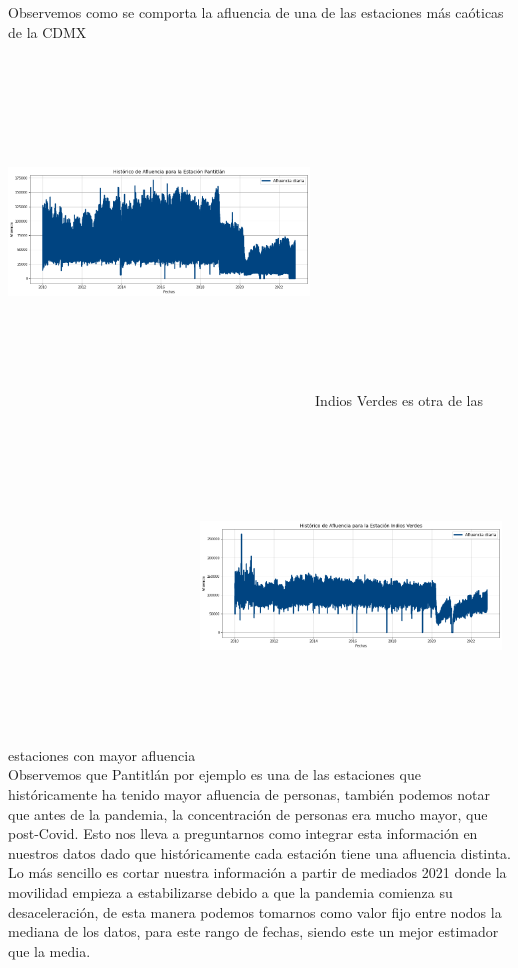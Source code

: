 \documentclass[
]{article}
\begin{document}
Observemos como se comporta la afluencia de una de las estaciones más
caóticas de la CDMX

\includegraphics[width=0.6\textwidth,height=3.64583in]{Imagenes/Pantitlan.png}
Indios Verdes es otra de las estaciones con mayor afluencia
\includegraphics[width=0.6\textwidth,height=3.64583in]{Imagenes/IndiosVerdes.png}
Observemos que Pantitlán por ejemplo es una de las estaciones que
históricamente ha tenido mayor afluencia de personas, también podemos
notar que antes de la pandemia, la concentración de personas era mucho
mayor, que post-Covid. Esto nos lleva a preguntarnos como integrar esta
información en nuestros datos dado que históricamente cada estación
tiene una afluencia distinta. Lo más sencillo es cortar nuestra
información a partir de mediados 2021 donde la movilidad empieza a
estabilizarse debido a que la pandemia comienza su desaceleración, de
esta manera podemos tomarnos como valor fijo entre nodos la mediana de
los datos, para este rango de fechas, siendo este un mejor estimador que
la media.
\end{document}
